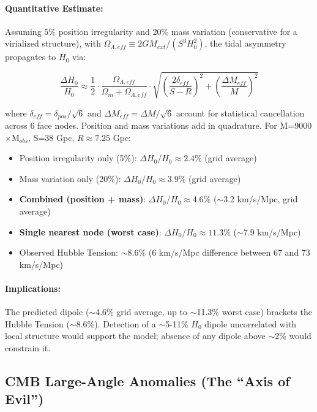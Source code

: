 \documentclass{article}
\begin{document}
\paragraph{Quantitative Estimate:}
Assuming 5\% position irregularity and 20\% mass variation (conservative for a virialized structure), with $\Omega_{\Lambda,eff} \equiv 2 G M_{ext} / (S^3 H_0^2)$, the tidal asymmetry propagates to $H_0$ via:

\[
\frac{\Delta H_0}{H_0} \approx \frac{1}{2} \cdot \frac{\Omega_{\Lambda,eff}}{\Omega_m + \Omega_{\Lambda,eff}} \cdot \sqrt{\left(\frac{2\delta_{eff}}{S - R}\right)^2 + \left(\frac{\Delta M_{eff}}{M}\right)^2}
\]

where $\delta_{eff} = \delta_{pos}/\sqrt{6}$ and $\Delta M_{eff} = \Delta M / \sqrt{6}$ account for statistical cancellation across 6 face nodes. Position and mass variations add in quadrature.
For M=9000$\times$M$_{obs}$, S=38 Gpc, $R \approx 7.25$ Gpc:

\begin{itemize}
    \item Position irregularity only (5\%): $\Delta H_0 / H_0 \approx 2.4\%$ (grid average)
    \item Mass variation only (20\%): $\Delta H_0 / H_0 \approx 3.9\%$ (grid average)
    \item \textbf{Combined (position + mass)}: $\Delta H_0 / H_0 \approx 4.6\%$ ($\sim$3.2 km/s/Mpc, grid average)
    \item \textbf{Single nearest node (worst case)}: $\Delta H_0 / H_0 \approx 11.3\%$ ($\sim$7.9 km/s/Mpc)
    \item Observed Hubble Tension: $\sim$8.6\% (6 km/s/Mpc difference between 67 and 73 km/s/Mpc)
\end{itemize}

\paragraph{Implications:}
The predicted dipole ($\sim$4.6\% grid average, up to $\sim$11.3\% worst case) brackets the Hubble Tension ($\sim$8.6\%).
Detection of a $\sim$5-11\% $H_0$ dipole uncorrelated with local structure would support the model; absence of any dipole above $\sim$2\% would constrain it.

\subsection{CMB Large-Angle Anomalies (The ``Axis of Evil'')}
\label{sec:axis-of-evil}
\end{document}
